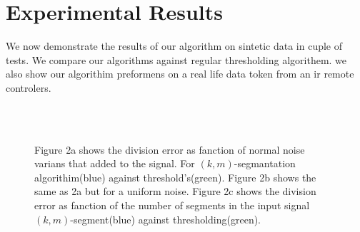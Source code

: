 \documentclass{vldb}
\begin{document}
\section{Experimental Results} \label{Experimental Results}
We now demonstrate the results of our algorithm on sintetic data in cuple of tests. We compare our algorithms against regular thresholding algorithem. we also show our algorithim preformens on a real life data token from an ir remote controlers.

\begin{figure}[H]
\centering
{} \\
\\
\centering{}
\caption{Figure 2a shows the division error as fanction of normal noise varians that added to the signal. For $(k,m)$-segmantation algorithim(blue) against threshold's(green). Figure 2b shows the same as 2a but for a uniform noise. Figure 2c shows the division error as fanction of the number of segments in the input signal $(k,m)$-segment(blue) against  thresholding(green).  }
\label{noise}
\end{figure}
\end{document}
